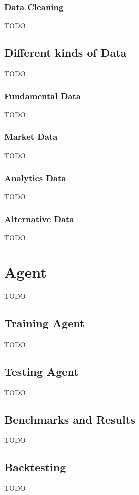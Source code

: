 \subsection{Data Cleaning}
TODO


\section{Different kinds of Data}
TODO

\subsection{Fundamental Data}
TODO

\subsection{Market Data}
TODO

\subsection{Analytics Data}
TODO

\subsection{Alternative Data}
TODO




\chapter{Agent}
TODO


\section{Training Agent}
TODO


\section{Testing Agent}
TODO


\section{Benchmarks and Results}
TODO


\section{Backtesting}
TODO


